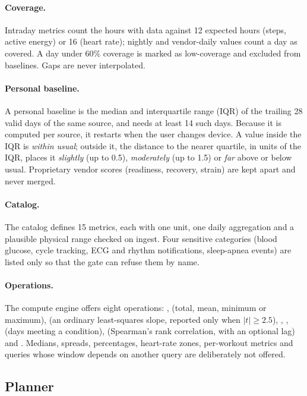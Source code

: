 \paragraph{Coverage.} Intraday metrics count the hours with data against 12 expected hours (steps, active energy)
or 16 (heart rate); nightly and vendor-daily values count a day as covered. A day under 60\% coverage is marked as
low-coverage and excluded from baselines. Gaps are never interpolated.

\paragraph{Personal baseline.} A personal baseline is the median and interquartile range (IQR) of the trailing 28
valid days of the same source, and needs at least 14 such days. Because it is computed per source, it restarts
when the user changes device. A value inside the IQR is \emph{within usual}; outside it, the distance to the
nearer quartile, in units of the IQR, places it \emph{slightly} (up to 0.5), \emph{moderately} (up to 1.5) or
\emph{far} above or below usual. Proprietary vendor scores (readiness, recovery, strain) are kept apart and never
merged.

\paragraph{Catalog.} The catalog defines 15 metrics, each with one unit, one daily aggregation and a plausible
physical range checked on ingest. Four sensitive categories (blood glucose, cycle tracking, ECG and rhythm
notifications, sleep-apnea events) are listed only so that the gate can refuse them by name.

\paragraph{Operations.} The compute engine offers eight operations: ,  (total, mean,
minimum or maximum),  (an ordinary least-squares slope, reported only when $|t|\geq 2.5$),
, ,  (days meeting a condition),
 (Spearman's rank correlation, with an optional lag) and . Medians, spreads,
percentages, heart-rate zones, per-workout metrics and queries whose window depends on another query are
deliberately not offered.

\subsection{Planner}\label{sec:planner}

